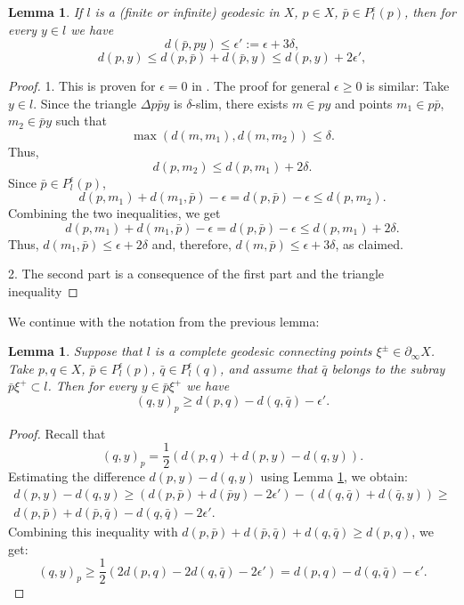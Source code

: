\documentclass[12pt]{amsbook}%
\newtheorem{lem}[thm]{Lemma}
\theoremstyle{definition}
\theoremstyle{remark}
\numberwithin{section}{chapter}
\numberwithin{subsection}{section}
\numberwithin{figure}{chapter}
\def\half{\frac{1}{2}}
\def\eps{\epsilon}
\def\geo{\partial_\infty}
\begin{document}
\begin{lem}\label{lem:1}
If $l$ is a (finite or infinite) geodesic in $X$, $p\in X$, $\bar{p}\in P^\eps_l(p)$, then for every 
$y\in l$ we have
\begin{equation}\label{eq:projection0}
 d(\bar{p}, py)\leqslant \eps':=\eps+ 3\delta, 
\end{equation}
\begin{equation}\label{eq:projection}
d(p, y) \leqslant d(p, \bar{p}) + d(\bar{p}, y)\leqslant d(p, y) +2\eps', 
\end{equation}
\end{lem} 
\begin{proof} 1. This is proven for $\eps=0$ in \cite[Lemma 1.105]{Kapovich-Sardar}. The proof for general $\eps\geqslant 0$ is similar: 
Take $y\in l$. Since the triangle $\Delta p \bar{p} y$ is $\delta$-slim, there exists $m\in py$ and points $m_1\in 
p \bar{p}$, $m_2\in \bar{p}y$ such that
$$
\max( d(m, m_1), d(m, m_2))\leqslant \delta. 
$$
Thus,
$$
d(p, m_2)\leqslant d(p, m_1)+ 2\delta.$$
Since $\bar{p}\in P^\eps_l(p)$, 
$$
d(p, m_1) + d(m_1, \bar{p}) -\eps= d(p, \bar{p})-\eps \leqslant d(p, m_2).$$ 
Combining the two inequalities, we get
$$
d(p, m_1) + d(m_1, \bar{p}) -\eps= d(p, \bar{p})-\eps \leqslant d(p, m_1)+ 2\delta.$$ 
Thus, $d(m_1, \bar{p})\leqslant \eps+2\delta$ and, therefore, $d(m, \bar{p})\leqslant \eps+3\delta$, as claimed. 

2. The second part is a consequence of the first part and the triangle inequality
\end{proof} 


We continue with the notation from the previous lemma: 

\begin{lem}\label{lem:2}
Suppose that $l$ is a complete geodesic connecting points $\xi^\pm\in \geo X$. 
Take $p, q\in X$, $\bar{p}\in P^\eps_l(p)$, $\bar{q}\in P^\eps_l(q)$, and assume that 
$\bar{q}$ belongs to the subray $\bar{p}\xi^+\subset l$. Then for every 
$y\in \bar{p}\xi^+$ we have
$$
(q,y)_p\geqslant d(p,q) - d(q, \bar{q}) -\eps'. 
$$
\end{lem}
\begin{proof} Recall that 
$$
(q,y)_p= \half(d(p,q) + d(p,y)  - d(q,y)). 
$$
Estimating the difference $d(p,y)  - d(q,y)$ using Lemma \ref{lem:1}, we obtain:
\begin{align*}
d(p,y)  - d(q,y) \geqslant (d(p, \bar{p}) + d(\bar{p}y) -2\eps') - (d(q,\bar{q}) + d(\bar{q}, y))\ge\\
d(p, \bar{p}) + d(\bar{p}, \bar{q}) - d(q, \bar{q}) -2\eps'. 
\end{align*}
Combining this inequality with $d(p, \bar{p}) + d(\bar{p}, \bar{q}) + d(q, \bar{q})\geqslant d(p,q)$, we get:
$$
(q,y)_p\geqslant \half \left( 2 d(p,q) -2 d(q, \bar{q}) - 2\eps'\right) = d(p,q) - d(q, \bar{q}) - \eps'. 
$$
\end{proof}
\end{document}
